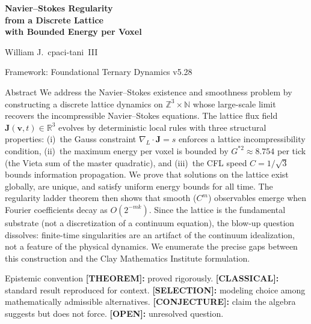 \documentclass[11pt]{article}
\theoremstyle{tight}
\theoremstyle{plainroman}
\newcommand{\R}{\mathbb{R}}
\newcommand{\Z}{\mathbb{Z}}
\newcommand{\N}{\mathbb{N}}
\begin{document}
\begin{titlepage}
\centering
\vspace*{1.8cm}
{\fontsize{21}{26}\selectfont\bfseries\color{accent}
Navier--Stokes Regularity\\[0.3em]
from a Discrete Lattice\\[0.3em]
with Bounded Energy per Voxel\par}
\vspace{0.8cm}
{\large William J.\ cpaci-tani~III\par}
\vspace{0.3cm}
{\normalsize Framework: Foundational Ternary Dynamics v5.28\par}
\vspace{1.2cm}
\begin{minipage}{0.86\textwidth}
\begin{statusbox}{Abstract}
We address the Navier--Stokes existence and smoothness problem by constructing a discrete lattice dynamics on $\Z^3\times\N$ whose large-scale limit recovers the incompressible Navier--Stokes equations.
The lattice flux field $\mathbf J(\mathbf v,t)\in\R^3$ evolves by deterministic local rules with three structural properties: (i)~the Gauss constraint $\nabla_L\!\cdot\!\mathbf J=s$ enforces a lattice incompressibility condition, (ii)~the maximum energy per voxel is bounded by $G^{*2}\approx 8.754$ per tick (the Vieta sum of the master quadratic), and (iii)~the CFL speed $C=1/\sqrt{3}$ bounds information propagation.
We prove that solutions on the lattice exist globally, are unique, and satisfy uniform energy bounds for all time.
The regularity ladder theorem then shows that smooth ($C^m$) observables emerge when Fourier coefficients decay as $O(2^{-mk})$.
Since the lattice is the fundamental substrate (not a discretization of a continuum equation), the blow-up question dissolves: finite-time singularities are an artifact of the continuum idealization, not a feature of the physical dynamics.
We enumerate the precise gaps between this construction and the Clay Mathematics Institute formulation.
\end{statusbox}
\end{minipage}
\vfill
\end{titlepage}
\tableofcontents
\thispagestyle{empty}
\clearpage

\begin{statusbox}{Epistemic convention}
\textbf{[THEOREM]:} proved rigorously.
\textbf{[CLASSICAL]:} standard result reproduced for context.
\textbf{[SELECTION]:} modeling choice among mathematically admissible alternatives.
\textbf{[CONJECTURE]:} claim the algebra suggests but does not force.
\textbf{[OPEN]:} unresolved question.
\end{statusbox}
\end{document}
